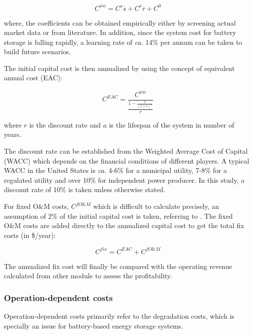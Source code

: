 \begin{equation}
C^{ini} = C^s \overline{s} + C^r \overline{r} + C^0
\end{equation}

where, the coefficients can be obtained empirically either by screening actual market data or from literature. In addition, since the system cost for battery storage is falling rapidly, a learning rate of \textit{ca.} 14\% per annum can be taken to build future scenarios\cite{Nykvist2015}.

The initial capital cost is then annualized by using the concept of equivalent annual cost (EAC):

\begin{equation}
C^{EAC} = \frac{C^{ini}}{\frac{1 - \frac{1}{(1+r)^a}}{r}}
\end{equation}

where $r$ is the discount rate and $a$ is the lifespan of the system in number of years.

The discount rate can be established from the Weighted Average Cost of Capital (WACC) which depends on the financial conditions of different players. A typical WACC in the United States is \textit{ca.} 4-6\% for a municipal utility, 7-8\% for a regulated utility and over 10\% for independent power producer\cite{Rastler2010}. In this study, a discount rate of 10\% is taken unless otherwise stated.

For fixed O\&M costs, $C^{fO\&M}$ which is difficult to calculate precisely, an assumption of 2\% of the initial capital cost is taken, referring to \cite{Rastler2010}. The fixed O\&M costs are added directly to the annualized capital cost to get the total fix costs (in \$/year):

\begin{equation}
C^{fix} = C^{EAC} +  C^{fO\&M}
\end{equation}

The annualized fix cost will finally be compared with the operating revenue calculated from other module to assess the profitability.

\subsubsection{Operation-dependent costs}

Operation-dependent costs primarily refer to the degradation costs, which is specially an issue for battery-based energy storage systems\cite{Barre2013}.

